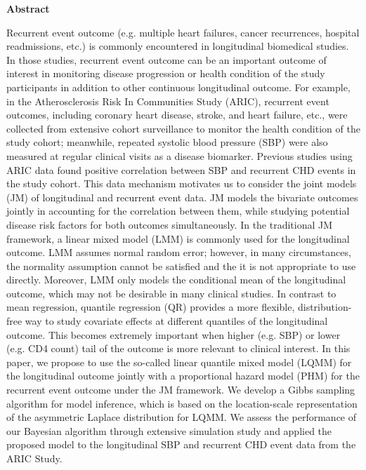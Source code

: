 \author{}
\date{}

\maketitle


\begin{center}
{\bf Abstract}
\end{center}

Recurrent event outcome (e.g. multiple heart failures, cancer recurrences, hospital readmissions, etc.) is commonly encountered in longitudinal biomedical studies. In those studies, recurrent event outcome can be an important outcome of interest in monitoring disease progression or health condition of the study participants in addition to other continuous longitudinal outcome. For example, in the Atherosclerosis Risk In Communities Study (ARIC), recurrent event outcomes, including coronary heart disease, stroke, and heart failure, etc., were collected from extensive cohort surveillance to monitor the health condition of the study cohort; meanwhile, repeated systolic blood pressure (SBP) were also measured at regular clinical visits as a disease biomarker. Previous studies using ARIC data found positive correlation between SBP and recurrent CHD events in the study cohort. This data mechanism motivates us to consider the joint models (JM) of longitudinal and recurrent event data. JM models the bivariate outcomes jointly in accounting for the correlation between them, while studying potential disease risk factors for both outcomes simultaneously. In the traditional JM framework, a linear mixed model (LMM) is commonly used for the longitudinal outcome. LMM assumes normal random error; however, in many circumstances, the normality assumption cannot be satisfied and the it is not appropriate to use directly. Moreover, LMM only models the conditional mean of the longitudinal outcome, which may not be desirable in many clinical studies. In contrast to mean regression, quantile regression (QR) provides a more flexible, distribution-free way to study covariate effects at different quantiles of the longitudinal outcome. This becomes extremely important when higher (e.g. SBP) or lower (e.g. CD4 count) tail of the outcome is more relevant to clinical interest. In this paper, we propose to use the so-called linear quantile mixed model (LQMM) for the longitudinal outcome jointly with a proportional hazard model (PHM) for the recurrent event outcome under the JM framework. We develop a Gibbs sampling algorithm for model inference, which is based on the location-scale representation of the asymmetric Laplace distribution for LQMM. We assess the performance of our Bayesian algorithm through extensive simulation study and applied the proposed model to the longitudinal SBP and recurrent CHD event data from the ARIC Study.

